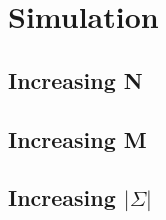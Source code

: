 \section{Simulation}
\subsection{Increasing N}

\subsection{Increasing M}

\subsection{Increasing $\vert\Sigma\vert$}


